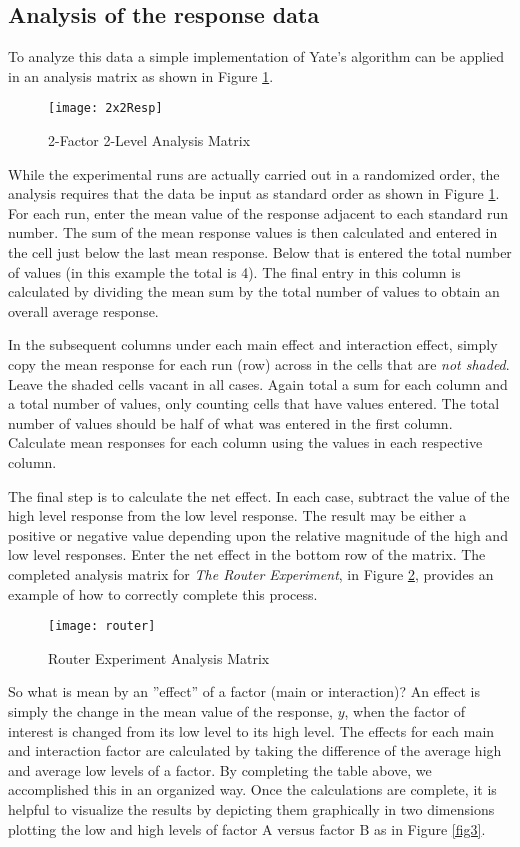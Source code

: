\subsection{Analysis of the response data}
To analyze this data a simple implementation of Yate's algorithm can be applied in an analysis matrix as shown in Figure \ref{fig1}.
\begin{figure}[h]\caption{2-Factor 2-Level Analysis Matrix}\label{fig1}
\begin{center}
\texttt{[image: 2x2Resp]}
\end{center}
\end{figure}
While the experimental runs are actually carried out in a randomized order, the analysis requires that the data be input as standard order as shown in Figure \ref{fig1}. For each run, enter the mean value of the response adjacent to each standard run number.  The sum of the mean response values is then calculated and entered in the cell just below the last mean response.  Below that is entered the total number of values (in this example the total is 4). The final entry in this column is calculated by dividing the mean sum by the total number of values to obtain an overall average response.

In the subsequent columns under each main effect and interaction effect, simply copy the mean response for each run (row) across in the cells that are \textit{not shaded}.  Leave the shaded cells vacant in all cases. Again total a sum for each column and a total number of values, only counting cells that have values entered.  The total number of values should be half of what was entered in the first column.  Calculate mean responses for each column using the values in each respective column.

The final step is to calculate the net effect.  In each case, subtract the value of the high level response from the low level response.  The result may be either a positive or negative value depending upon the relative magnitude of the high and low level responses.  Enter the net effect in the  bottom row of the matrix.  The completed analysis matrix for \textit{The Router Experiment}, in Figure \ref{fig2}, provides an example of how to correctly complete this process.
\begin{figure}[h]\caption{Router Experiment Analysis Matrix}\label{fig2}
\begin{center}
\texttt{[image: router]}
\end{center}
\end{figure}
So what is mean by an ''effect'' of a factor (main or interaction)?  An effect is simply the change in the mean value of the response, $y$, when the factor of interest is changed from its low level to its high level.  The effects for each main and interaction factor are calculated by taking the difference of the average high and average low levels of a factor. By completing the table above, we accomplished this in an organized way. Once the calculations are complete, it is helpful to visualize the results by depicting them graphically in two dimensions plotting the low and high levels of factor A versus factor B as in Figure \ref{fig3}.

